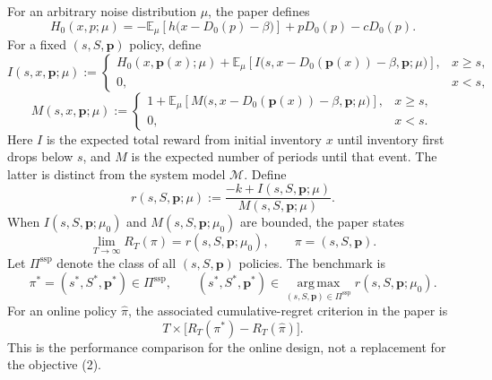 \documentclass[11pt]{article}
\begin{document}
For an arbitrary noise distribution \(\mu\), the paper defines
\begin{equation}
H_0(x,p;\mu)
=-\mathbb{E}_{\mu}\!\left[h\bigl(x-D_0(p)-\beta\bigr)\right]
+pD_0(p)-cD_0(p).
\tag{4}
\end{equation}
For a fixed \((s,S,\boldsymbol p)\) policy, define
\begin{equation}
I(s,x,\boldsymbol p;\mu):=
\begin{cases}
H_0(x,\boldsymbol p(x);\mu)
+\mathbb{E}_{\mu}\!\left[
 I\bigl(s,x-D_0(\boldsymbol p(x))-\beta,\boldsymbol p;\mu\bigr)
\right],&x\geq s,\\
0,&x<s,
\end{cases}
\tag{5}
\end{equation}
\begin{equation}
M(s,x,\boldsymbol p;\mu):=
\begin{cases}
1+\mathbb{E}_{\mu}\!\left[
 M\bigl(s,x-D_0(\boldsymbol p(x))-\beta,\boldsymbol p;\mu\bigr)
\right],&x\geq s,\\
0,&x<s.
\end{cases}
\tag{6}
\end{equation}
Here \(I\) is the expected total reward from initial inventory \(x\) until inventory first drops below \(s\), and \(M\) is the expected number of periods until that event. The latter is distinct from the system model \(\mathcal M\). Define
\begin{equation}
r(s,S,\boldsymbol p;\mu):=
\frac{-k+I(s,S,\boldsymbol p;\mu)}{M(s,S,\boldsymbol p;\mu)}.
\tag{7}
\end{equation}
When \(I(s,S,\boldsymbol p;\mu_0)\) and \(M(s,S,\boldsymbol p;\mu_0)\) are bounded, the paper states
\[
\lim_{T\to\infty}R_T(\pi)=r(s,S,\boldsymbol p;\mu_0),
\qquad \pi=(s,S,\boldsymbol p).
\]
Let \(\Pi^{\mathrm{ssp}}\) denote the class of all \((s,S,\boldsymbol p)\) policies. The benchmark is
\[
\pi^*=(s^*,S^*,\boldsymbol p^*)\in\Pi^{\mathrm{ssp}},
\qquad
(s^*,S^*,\boldsymbol p^*)\in
\operatorname*{arg\,max}_{(s,S,\boldsymbol p)\in\Pi^{\mathrm{ssp}}}
 r(s,S,\boldsymbol p;\mu_0).
\]
For an online policy \(\widehat\pi\), the associated cumulative-regret criterion in the paper is
\begin{equation}
T\times\bigl[R_T(\pi^*)-R_T(\widehat\pi)\bigr].
\tag{3}
\end{equation}
This is the performance comparison for the online design, not a replacement for the objective (2).
\end{document}
